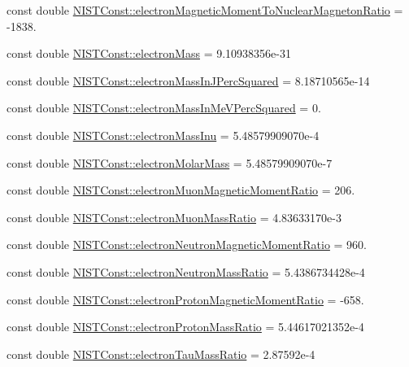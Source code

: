\begin{DoxyCompactItemize}
\item 
const double \hyperlink{group___electron_ga2c0f984bb3ae4dd8ca2696d4fec8f9bf}{N\+I\+S\+T\+Const\+::electron\+Magnetic\+Moment\+To\+Nuclear\+Magneton\+Ratio} = -\/1838.
\item 
const double \hyperlink{group___electron_ga2c9773ce81cfbe85e9042adccd788589}{N\+I\+S\+T\+Const\+::electron\+Mass} = 9.\+10938356e-\/31
\item 
const double \hyperlink{group___electron_gad128828903af19e91fdc1a95ef9cbb24}{N\+I\+S\+T\+Const\+::electron\+Mass\+In\+J\+Perc\+Squared} = 8.\+18710565e-\/14
\item 
const double \hyperlink{group___electron_ga6a41b7cbd78c00ef17e9b17944ab5f5c}{N\+I\+S\+T\+Const\+::electron\+Mass\+In\+Me\+V\+Perc\+Squared} = 0.
\item 
const double \hyperlink{group___electron_gaa6fc2ab3a81cd61f6d78d64eec8a670d}{N\+I\+S\+T\+Const\+::electron\+Mass\+Inu} = 5.\+48579909070e-\/4
\item 
const double \hyperlink{group___electron_gaebecd54c70326d72d25d790c0ab62145}{N\+I\+S\+T\+Const\+::electron\+Molar\+Mass} = 5.\+48579909070e-\/7
\item 
const double \hyperlink{group___electron_gacd4a3b462095f6b3ec3de099a34b9726}{N\+I\+S\+T\+Const\+::electron\+Muon\+Magnetic\+Moment\+Ratio} = 206.
\item 
const double \hyperlink{group___electron_ga6b6bb303de5ee3bd95d18e8024880eea}{N\+I\+S\+T\+Const\+::electron\+Muon\+Mass\+Ratio} = 4.\+83633170e-\/3
\item 
const double \hyperlink{group___electron_ga556c66115bf01b011616c5675e8b33c1}{N\+I\+S\+T\+Const\+::electron\+Neutron\+Magnetic\+Moment\+Ratio} = 960.
\item 
const double \hyperlink{group___electron_gad051ac865a63e667306850054f912ab1}{N\+I\+S\+T\+Const\+::electron\+Neutron\+Mass\+Ratio} = 5.\+4386734428e-\/4
\item 
const double \hyperlink{group___electron_ga8ea70b9b79c3f8b4f9825c48d1758f44}{N\+I\+S\+T\+Const\+::electron\+Proton\+Magnetic\+Moment\+Ratio} = -\/658.
\item 
const double \hyperlink{group___electron_gabbaa23094e18f2b83e6145adaebbb6e7}{N\+I\+S\+T\+Const\+::electron\+Proton\+Mass\+Ratio} = 5.\+44617021352e-\/4
\item 
const double \hyperlink{group___electron_ga513e30853388cdd091c192dfb6371fa8}{N\+I\+S\+T\+Const\+::electron\+Tau\+Mass\+Ratio} = 2.\+87592e-\/4
\item 

\end{DoxyCompactItemize}
